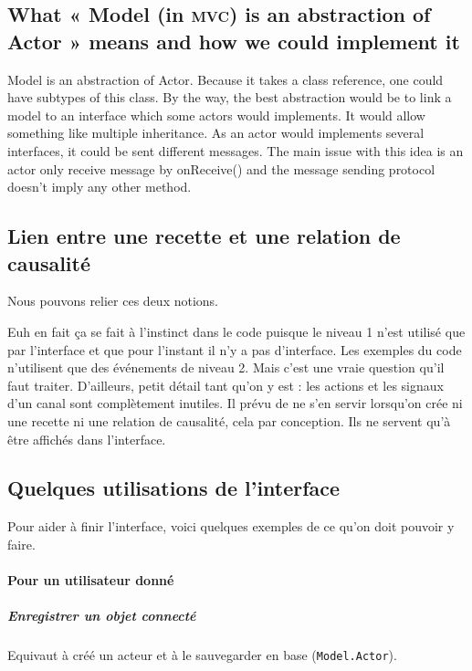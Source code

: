 \documentclass[11pt]{article}
\begin{document}

\subsection{What « Model (in \textsc{mvc}) is an abstraction of Actor » means and how we could implement it}

Model is an abstraction of Actor. Because it takes a class reference, one could have subtypes of this class. By the way, the best abstraction would be to link a model to an interface which some actors would implements. It would allow something like multiple inheritance. As an actor would implements several interfaces, it could be sent different messages. The main issue with this idea is an actor only receive message by onReceive() and the message sending protocol doesn't imply any other method.


\subsection{Lien entre une recette et une relation de causalité}

Nous pouvons relier ces deux notions.

Euh en fait ça se fait à l'instinct dans le code puisque le niveau 1 n'est utilisé que par l'interface et que pour l'instant il n'y a pas d'interface. Les exemples du code n'utilisent que des événements de niveau 2. Mais c'est une vraie question qu'il faut traiter. D'ailleurs, petit détail tant qu'on y est : les actions et les signaux d'un canal sont complètement inutiles. Il prévu de ne s'en servir lorsqu'on crée ni une recette ni une relation de causalité, cela par conception. Ils ne servent qu'à être affichés dans l'interface.

\subsection{Quelques utilisations de l'interface}

Pour aider à finir l'interface, voici quelques exemples de ce qu'on doit pouvoir y faire.

\paragraph{Pour un utilisateur donné}

\subparagraph{Enregistrer un objet connecté} Equivaut à créé un acteur et à le sauvegarder en base (\texttt{Model.Actor}).
\end{document}
